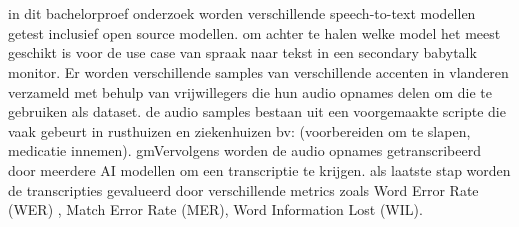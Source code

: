 
%
%
%
%
%

%



\chapter*{}

in dit bachelorproef onderzoek worden verschillende speech-to-text modellen getest inclusief open source modellen. om achter te halen welke model het meest geschikt is voor de use case van spraak naar tekst in een secondary babytalk monitor. Er worden verschillende samples van verschillende accenten in vlanderen verzameld met behulp van vrijwillegers die hun audio opnames delen om die te gebruiken als dataset. de audio samples bestaan uit een voorgemaakte scripte die vaak gebeurt in rusthuizen en ziekenhuizen bv: (voorbereiden om te slapen, medicatie innemen). gmVervolgens worden de audio opnames getranscribeerd door meerdere AI modellen om een transcriptie te krijgen. als laatste stap worden de transcripties gevalueerd door verschillende metrics zoals Word Error Rate (WER) , Match Error Rate (MER), Word Information Lost (WIL). 

